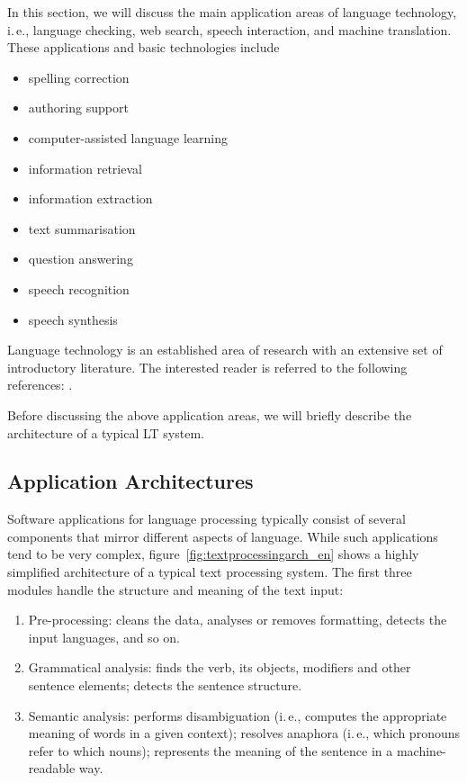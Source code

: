 \begin{multicols}{2}
In this section, we will discuss the main application areas of language technology, i.\,e., language checking, web search, speech interaction, and machine translation. These applications and basic technologies include

\begin{itemize}
\item spelling correction
\item authoring support
\item computer-assisted language learning
\item information retrieval 
\item information extraction
\item text summarisation
\item question answering
\item speech recognition 
\item speech synthesis 
\end{itemize}

Language technology is an established area of research with an extensive set of introductory literature. The interested reader is referred to the following references: \cite{carstensen-etal1, jurafsky-martin01, manning-schuetze1, lt-world1, lt-survey1}.

Before discussing the above application areas, we will briefly describe the architecture of a typical LT system.

\subsection{Application Architectures}

Software applications for language processing typically consist of several components that mirror different aspects of language. While such applications tend to be very complex, figure~\ref{fig:textprocessingarch_en} shows a highly simplified architecture of a typical text processing system. The first three modules handle the structure and meaning of the text input:

\begin{enumerate} 
\item Pre-processing: cleans the data, analyses or removes formatting, detects the input languages, and so on.  
\item Grammatical analysis: finds the verb, its objects, modifiers and other sentence elements; detects the sentence structure.  
\item Semantic analysis: performs disambiguation (i.\,e., computes the appropriate meaning of words in a given context); resolves anaphora (i.\,e., which pronouns refer to which nouns); represents the meaning of the sentence in a machine-readable way.  
\end{enumerate}


\end{multicols}
